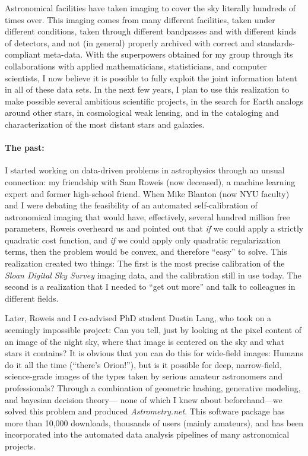 \documentclass[11pt, letterpaper]{article}
\begin{document}
\sloppy\sloppypar

Astronomical facilities have taken imaging to cover the sky literally hundreds of times over.
This imaging comes from many different facilities, taken under different conditions,
  taken through different bandpasses and with different kinds of detectors,
  and not (in general) properly archived with correct and standards-compliant meta-data.
With the superpowers obtained for my group through its collaborations with
  applied mathematicians, statisticians, and computer scientists,
  I now believe it is possible to fully exploit the joint information latent in all of these data sets.
In the next few years,
  I plan to use this realization to make possible several ambitious scientific projects,
  in the search for Earth analogs around other stars,
  in cosmological weak lensing,
  and in the cataloging and characterization of the most distant stars and galaxies.

\paragraph{The past:}
I started working on data-driven problems in astrophysics through an unsual connection:
  my friendship with Sam Roweis (now deceased), a machine learning expert and former high-school friend.
When Mike Blanton (now NYU faculty) and I were debating the feasibility of an automated self-calibration
  of astronomical imaging that would have, effectively, several hundred million free parameters,
  Roweis overheard us and pointed out that \emph{if} we could apply a strictly quadratic cost function,
  and \emph{if} we could apply only quadratic regularization terms,
  then the problem would be convex, and therefore ``easy'' to solve.
This realization created two things:
The first is the most precise calibration of the \textsl{Sloan Digital Sky Survey} imaging data,
  and the calibration still in use today.
The second is a realization that I needed to ``get out more'' and talk to colleagues in different fields.

Later, Roweis and I co-advised PhD student Dustin Lang, who took on a seemingly impossible project:
Can you tell, just by looking at the pixel content of an image of the night sky,
  where that image is centered on the sky and what stars it contains?
It is obvious that you can do this for wide-field images:  Humans do it all the time (``there's Orion!''),
  but is it possible for deep, narrow-field, science-grade images of the types taken by serious amateur astronomers
  and professionals?
Through a combination of geometric hashing, generative modeling, and bayesian decision theory---%
  none of which I knew about beforehand---we solved this problem and produced \textsl{Astrometry.net}.
This software package has more than 10,000 downloads, thousands of users (mainly amateurs),
  and has been incorporated into the automated data analysis pipelines of many astronomical projects.
\end{document}
